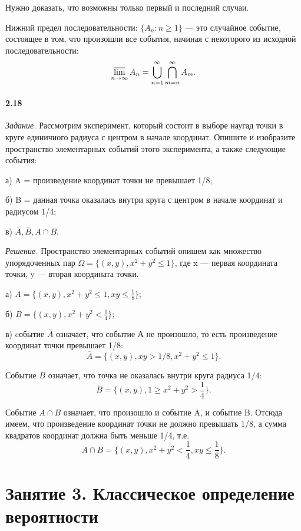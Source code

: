 \documentclass{book}
\begin{document}
Нужно доказать, что возможны только первый и последний случаи.

Нижний предел последовательности: $\{A_n: n\geq 1\}$ --- это случайное событие, состоящее в том, что произошли все события, начиная с некоторого из исходной последовательности: $$\varlimsup\limits_{n\to\infty}A_n=\bigcup\limits_{n=1}^\infty\bigcap\limits_{m=n}^\infty A_m.$$

\subsubsection*{2.18}

\textit{Задание.} Рассмотрим эксперимент, который состоит в выборе наугад точки в круге единичного радиуса с центром в начале координат. Опишите и изобразите пространство элементарных событий этого эксперимента, а также следующие события:

а) A = {произведение координат точки не превышает 1/8};

б) B = {данная точка оказалась внутри круга с центром в начале координат и радиусом 1/4};

в) $\overline{A}, \overline{B}, A\cap B$.

\textit{Решение.} Пространство элементарных событий опишем как множество упорядоченных пар $\Omega=\{(x, y), x^2+y^2\leq 1\}$, где x --- первая координата точки, y --- вторая координата точки.

а) $A=\{(x, y), x^2+y^2\leq 1, xy\leq\frac{1}{8}\}$;

б) $B=\{(x, y), x^2+y^2<\frac{1}{4}\}$;

в) cобытие $\overline{A}$ означает, что событие А не произошло, то есть произведение координат точки превышает 1/8: $$\overline{A}=\{(x, y), xy>1/8, x^2+y^2\leq 1\}.$$

Событие $\overline{B}$ означает, что точка не оказалась внутри круга радиуса 1/4: $$\overline{B}=\{(x, y), 1\geq x^2+y^2>\frac{1}{4}\}.$$

Событие $A\cap B$ означает, что произошло и событие A, и событие B. Отсюда имеем, что произведение координат точки не должно превышать 1/8, а сумма квадратов координат должна быть меньше 1/4, т.е. $$A\cap B=\{(x, y), x^2+y^2<\frac{1}{4}, xy\leq\frac{1}{8}\}.$$

\chapter*{Занятие 3. Классическое определение вероятности}
\end{document}
